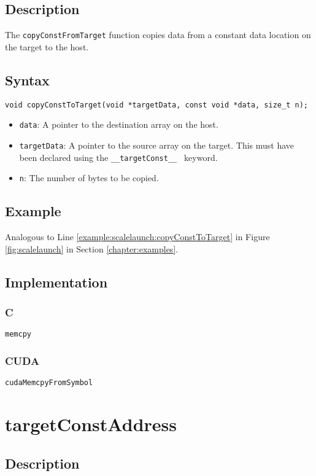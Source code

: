\subsection{Description}

The \verb+copyConstFromTarget+ function copies data from a constant data location on the target to the host.

\subsection{Syntax}
\begin{verbatim}
void copyConstToTarget(void *targetData, const void *data, size_t n);
\end{verbatim}

\begin{itemize}
\item \verb+data+: A pointer to the destination array on the host.
\item \verb+targetData+: A pointer to the source array on the target. This must have been declared using the \verb+__targetConst__ + keyword.
\item \verb+n+: The number of bytes to be copied.
\end{itemize}


\subsection{Example}
Analogous to Line \ref{example:scalelaunch:copyConstToTarget} in Figure \ref{fig:scalelaunch} in Section \ref{chapter:examples}.

\subsection{Implementation}
\subsubsection{C}
\verb+memcpy+
\subsubsection{CUDA}
\verb+cudaMemcpyFromSymbol+

\newpage
\section{targetConstAddress}

\subsection{Description}

